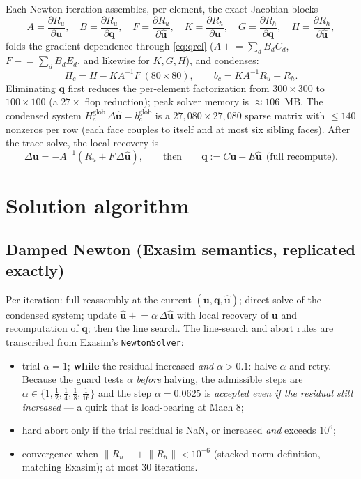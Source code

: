 \documentclass[11pt]{article}
\newcommand{\bu}{\mathbf{u}}
\newcommand{\bq}{\mathbf{q}}
\newcommand{\buh}{\widehat{\mathbf{u}}}
\newcommand{\code}[1]{\texttt{#1}}
\begin{document}
Each Newton iteration assembles, per element, the exact-Jacobian blocks
\begin{equation}
A = \frac{\partial R_u}{\partial \bu},\quad
B = \frac{\partial R_u}{\partial \bq},\quad
F = \frac{\partial R_u}{\partial \buh},\quad
K = \frac{\partial R_h}{\partial \bu},\quad
G = \frac{\partial R_h}{\partial \bq},\quad
H = \frac{\partial R_h}{\partial \buh},
\end{equation}
folds the gradient dependence through \eqref{eq:qrel}
($A \mathrel{+}= \sum_d B_d C_d$, $F \mathrel{-}= \sum_d B_d E_d$, and
likewise for $K, G, H$), and condenses:
\begin{equation}
H_c = H - K A^{-1} F \ (80\times80),\qquad
b_c = K A^{-1} R_u - R_h .
\end{equation}
Eliminating $\bq$ first reduces the per-element factorization from
$300\times300$ to $100\times100$ (a $27\times$ flop reduction); peak solver
memory is $\approx 106$~MB. The condensed system
$H_c^{\mathrm{glob}}\,\Delta\buh = b_c^{\mathrm{glob}}$ is a
$27{,}080\times27{,}080$ sparse matrix with $\le 140$ nonzeros per row (each
face couples to itself and at most six sibling faces). After the trace solve,
the local recovery is
\begin{equation}
\Delta\bu = -A^{-1}(R_u + F\,\Delta\buh),
\qquad\text{then}\qquad
\bq := C\bu - E\buh \ \ \text{(full recompute)}.
\end{equation}

\section{Solution algorithm}

\subsection{Damped Newton (Exasim semantics, replicated exactly)}
\label{sec:newton}

Per iteration: full reassembly at the current $(\bu, \bq, \buh)$; direct
solve of the condensed system; update $\buh \mathrel{+}= \alpha\,\Delta\buh$
with local recovery of $\bu$ and recomputation of $\bq$; then the line
search. The line-search and abort rules are transcribed from Exasim's
\code{NewtonSolver}:
\begin{itemize}
\item trial $\alpha = 1$; \textbf{while} the residual increased
\emph{and} $\alpha > 0.1$: halve $\alpha$ and retry. Because the guard tests
$\alpha$ \emph{before} halving, the admissible steps are
$\alpha \in \{1, \tfrac12, \tfrac14, \tfrac18, \tfrac1{16}\}$ and the step
$\alpha = 0.0625$ is \emph{accepted even if the residual still increased}
--- a quirk that is load-bearing at Mach 8;
\item hard abort only if the trial residual is NaN, or increased
\emph{and} exceeds $10^6$;
\item convergence when $\lVert R_u\rVert + \lVert R_h\rVert < 10^{-6}$
(stacked-norm definition, matching Exasim); at most 30 iterations.
\end{itemize}
\end{document}
